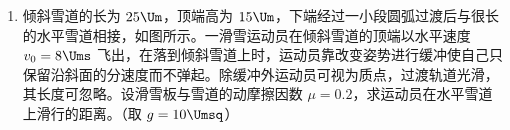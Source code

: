 \documentclass[\gkver]{gaokaozhenti}
\begin{document}
\begin{enumerate}
\begin{enumerate}
	\item
	利用伏安法测量干电池的电动势和内阻，现有的器材为：

	\begin{itemize}
		\item
		干电池：电动势约为 $1.5\UV$，符号如图\ref{2007宁夏理综22a}；
		\item
		电压表：量程 $1\UV$，内阻 $998.3\UO$，符号 V；
		\item
		电流表：量程 $1\UA$，符号 A；
		\item
		滑动变阻器：最大阻值 $99999.9\UO$，符号如图\ref{2007宁夏理综22b}；
		\item
		单刀单掷开关 1 个，符号如图\ref{2007宁夏理综22c}；
		\item
		导线若干。
	\end{itemize}

	{figs/22b.png}
	{figs/22c.png}

\end{enumerate}



\item
倾斜雪道的长为 $25\Um$，顶端高为 $15\Um$，下端经过一小段圆弧过渡后与很长的水平雪道相接，如图所示。一滑雪运动员在倾斜雪道的顶端以水平速度 $v_{0}=8\Ums$ 飞出，在落到倾斜雪道上时，运动员靠改变姿势进行缓冲使自己只保留沿斜面的分速度而不弹起。除缓冲外运动员可视为质点，过渡轨道光滑，其长度可忽略。设滑雪板与雪道的动摩擦因数 $\mu=0.2$，求运动员在水平雪道上滑行的距离。（取 $g=10\Umsq$）


\end{enumerate}
\end{document}
